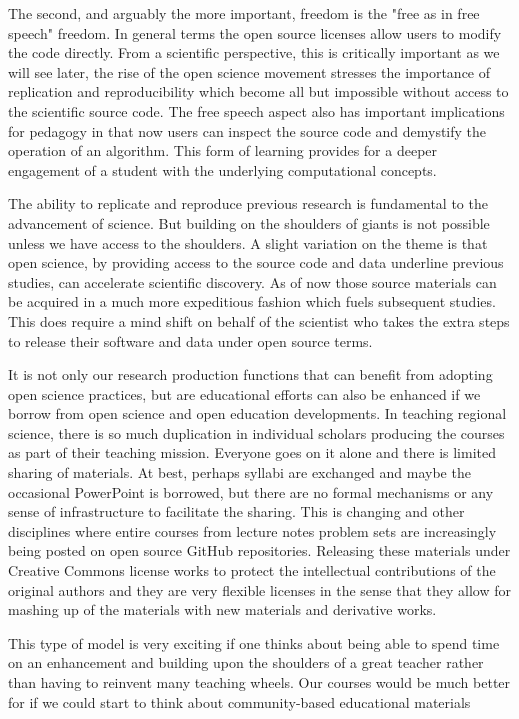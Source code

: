 \documentclass[11pt]{article}
\begin{document}
The second, and arguably the more important, freedom is the "free as in free
speech" freedom. In general terms the open source licenses allow users to
modify the code directly. From a scientific perspective, this is critically
important as we will see later, the rise of the open science movement stresses
the importance of replication and reproducibility which become all but
impossible without access to the scientific source code. The free speech aspect
also has important implications for pedagogy in that now users can inspect the
source code and demystify the operation of an algorithm. This form of learning
provides for a deeper engagement of a student with the underlying computational
concepts.


The ability to replicate and reproduce previous research is fundamental to
the advancement of science. But building on the shoulders of giants is not
possible unless we have access to the shoulders. A slight variation on the
theme is that open science, by providing access to the source code and data
underline previous studies, can accelerate scientific discovery. As of now those
source materials can be acquired in a much more expeditious fashion which fuels
subsequent studies. This does require a mind shift on behalf of
the scientist who takes the extra steps to release their software
and data under open source terms.

It is not only our research production functions that can benefit from adopting
open science practices, but are educational efforts can also be enhanced if we
borrow from open science and open education developments. In teaching regional
science, there is so much duplication in individual scholars producing the
courses as part of their teaching mission. Everyone goes on it alone and there
is limited sharing of materials. At best, perhaps syllabi are exchanged and
maybe the occasional PowerPoint is borrowed, but there are no formal mechanisms
or any sense of infrastructure to facilitate the sharing. This is changing and
other disciplines where entire courses from lecture notes problem sets are
increasingly being posted on open source GitHub repositories. Releasing these
materials under Creative Commons license works to protect the intellectual
contributions of the original authors and they are very flexible licenses in
the sense that they allow for mashing up of the materials with new materials
and derivative works.

This type of model is very exciting if one thinks about being able to spend
time on an enhancement  and building upon the shoulders of a great teacher
rather than having to reinvent many teaching wheels. Our courses would be much
better for if we could start to think about community-based educational
materials
\end{document}
